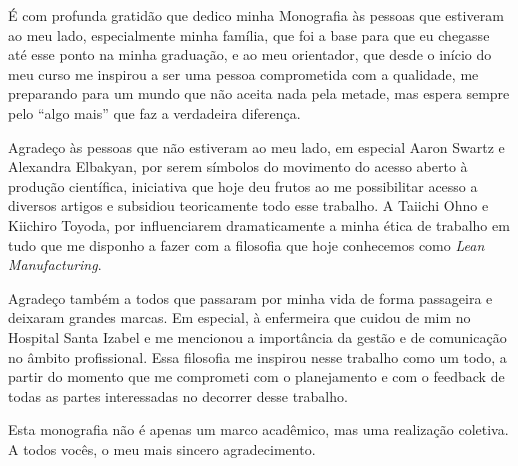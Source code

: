 É com profunda gratidão que dedico minha Monografia às pessoas que estiveram ao meu lado, especialmente minha família, que foi a base para que eu chegasse até esse ponto na minha graduação, e ao meu orientador, que desde o início do meu curso me inspirou a ser uma pessoa comprometida com a qualidade, me preparando para um mundo que não aceita nada pela metade, mas espera sempre pelo ``algo mais'' que faz a verdadeira diferença.

Agradeço às pessoas que não estiveram ao meu lado, em especial Aaron Swartz e Alexandra Elbakyan, por serem símbolos do movimento do acesso aberto à produção científica, iniciativa que hoje deu frutos ao me possibilitar acesso a diversos artigos e subsidiou teoricamente todo esse trabalho. A Taiichi Ohno e Kiichiro Toyoda, por influenciarem dramaticamente a minha ética de trabalho em tudo que me disponho a fazer com a filosofia que hoje conhecemos como \textit{Lean Manufacturing}.

Agradeço também a todos que passaram por minha vida de forma passageira e deixaram grandes marcas. Em especial, à enfermeira que cuidou de mim no Hospital Santa Izabel e me mencionou a importância da gestão e de comunicação no âmbito profissional. Essa filosofia me inspirou nesse trabalho como um todo, a partir do momento que me comprometi com o planejamento e com o feedback de todas as partes interessadas no decorrer desse trabalho.

Esta monografia não é apenas um marco acadêmico, mas uma realização coletiva. A todos vocês, o meu mais sincero agradecimento.
